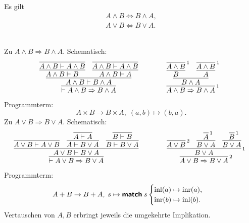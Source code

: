 \begin{Satz}%
\label{bool-cl}
Es gilt
\begin{gather*}
A\land B \iff B\land A,\\
A\lor B \iff B\lor A.
\end{gather*}
\end{Satz}
\begin{Beweis}\\
Zu $A\land B\Rightarrow B\land A$. Schematisch:
\[
\begin{array}{@{}l@{\qquad\qquad}l}
\infer{\vdash A\land B\Rightarrow B\land A}{
  \infer{A\land B\vdash B\land A}{
    \infer{A\land B\vdash B}{
      \infer{A\land B\vdash A\land B}{}}
    & \infer{A\land B\vdash A}{
      \infer{A\land B\vdash A\land B}{}}}}
&
\infer[\infernote{1}]{A\land B\Rightarrow B\land A}{
  \infer{B\land A}{
     \infer{B}{\infer[\infernote{1}]{A\land B}{}}
     & \infer{A}{\infer[\infernote{1}]{A\land B}{}}}}
\end{array}
\]
Programmterm:
\[A\times B\to B\times A,\; (a,b)\mapsto (b,a).\]
Zu $A\lor B\Rightarrow B\lor A$. Schematisch:
\[
\begin{array}{@{}l@{\qquad\qquad}l}
\infer{\vdash A\lor B\Rightarrow B\lor A}{
  \infer{A\lor B\vdash B\lor A}{
    \infer{A\lor B\vdash A\lor B}{}
    & \infer{A\vdash B\lor A}{
        \infer{A\vdash A}{}}
    & \infer{B\vdash B\lor A}{
        \infer{B\vdash B}{}}}}
&
\infer[\infernote{2}]{A\lor B\Rightarrow B\lor A}{
  \infer[\infernote{1}]{B\lor A}{
    \infer[\infernote{2}]{A\lor B}{}
    & \infer{B\lor A}{\infer[\infernote{1}]{A}{}}
    & \infer{B\lor A}{\infer[\infernote{1}]{B}{}}}}
\end{array}
\]
Programmterm:
\[A+B\to B+A,\; s\mapsto\text{{\normalfont\sffamily\bfseries match}}\; s\begin{cases}
\operatorname{inl}(a)\mapsto \operatorname{inr}(a),\\
\operatorname{inr}(b)\mapsto \operatorname{inl}(b).
\end{cases}\]
Vertauschen von $A,B$ erbringt jeweils die umgekehrte Implikation.\;\qedsymbol
\end{Beweis}

